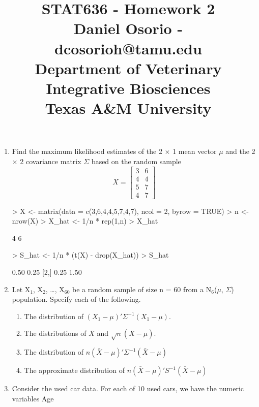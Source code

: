 \documentclass[12pt,a4paper]{paper}
\begin{document}
\title{STAT636 - Homework 2\\\small{Daniel Osorio - dcosorioh@tamu.edu\\Department of Veterinary Integrative Biosciences\\Texas A\&M University}}
\maketitle

\begin{enumerate}
\item Find the maximum likelihood estimates of the 2 $\times$ 1 mean vector $\mu$ and the 2 $\times$ 2 covariance matrix $\Sigma$ based on the random sample
\[X = \left[\begin{array}{cc}3 & 6\\4 & 4\\5 & 7\\4 & 7\end{array}\right]\]
\begin{Schunk}
\begin{Sinput}
> X <- matrix(data = c(3,6,4,4,5,7,4,7), ncol = 2, byrow = TRUE)
> n <- nrow(X)
> X_hat <- 1/n * rep(1,n) %*% X
> X_hat
\end{Sinput}
\begin{Soutput}
     [,1] [,2]
[1,]    4    6
\end{Soutput}
\begin{Sinput}
> S_hat <- 1/n * (t(X) - drop(X_hat)) %*% t(t(X) - drop(X_hat))
> S_hat
\end{Sinput}
\begin{Soutput}
     [,1] [,2]
[1,] 0.50 0.25
[2,] 0.25 1.50
\end{Soutput}
\end{Schunk}
\item Let X$_{1}$, X$_{2}$, \dots, X$_{60}$ be a random sample of size n = 60 from a N$_{6}$($\mu$, $\Sigma$) population. Specify each of the following.
\begin{enumerate}
\item The distribution of $(X_{1} - \mu)'\Sigma^{-1}(X_{1} - \mu)$.
\item The distributions of $\bar{X}$ and $\sqrt{n}(\bar{X} - \mu)$.
\item The distribution of $n(\bar{X}-\mu)'\Sigma^{-1}(\bar{X} - \mu)$
\item The approximate distribution of $n(\bar{X}-\mu)'S^{-1}(\bar{X} - \mu)$
\end{enumerate}
\item Consider the used car data. For each of 10 used cars, we have the numeric variables Age

\end{enumerate}
\end{document}
